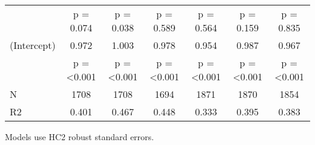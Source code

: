 \begin{table}[!h]
\begin{threeparttable}
{\begin{tabular}[t]{lcccccc}
 & p = \num{0.074} & p = \num{0.038} & p = \num{0.589} & p = \num{0.564} & p = \num{0.159} & p = \num{0.835}\\
(Intercept) & \num{0.972} & \num{1.003} & \num{0.978} & \num{0.954} & \num{0.987} & \num{0.967}\\
 & p = \num{<0.001} & p = \num{<0.001} & p = \num{<0.001} & p = \num{<0.001} & p = \num{<0.001} & p = \num{<0.001}\\
\midrule
N & \num{1708} & \num{1708} & \num{1694} & \num{1871} & \num{1870} & \num{1854}\\
R2 & \num{0.401} & \num{0.467} & \num{0.448} & \num{0.333} & \num{0.395} & \num{0.383}\\
\bottomrule
\end{tabular}}
\begin{tablenotes}
\item Models use HC2 robust standard errors.
\end{tablenotes}
\end{threeparttable}
\end{table}
